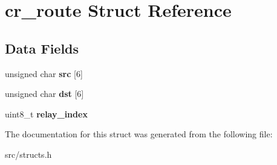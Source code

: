 \hypertarget{structcr__route}{\section{cr\-\_\-route Struct Reference}
\label{structcr__route}
}
\subsection*{Data Fields}
\begin{DoxyCompactItemize}
\item 
\hypertarget{structcr__route_a8c107a911b07dc61ddbc161b65f52a6b}{unsigned char {\bfseries src} \mbox{[}6\mbox{]}}\label{structcr__route_a8c107a911b07dc61ddbc161b65f52a6b}

\item 
\hypertarget{structcr__route_a8c561ee495f594e703b7ba593cef90cc}{unsigned char {\bfseries dst} \mbox{[}6\mbox{]}}\label{structcr__route_a8c561ee495f594e703b7ba593cef90cc}

\item 
\hypertarget{structcr__route_a1f4957acaa629d6064af8a2e424aaed6}{uint8\-\_\-t {\bfseries relay\-\_\-index}}\label{structcr__route_a1f4957acaa629d6064af8a2e424aaed6}

\end{DoxyCompactItemize}


The documentation for this struct was generated from the following file\-:\begin{DoxyCompactItemize}
\item 
src/structs.\-h\end{DoxyCompactItemize}
